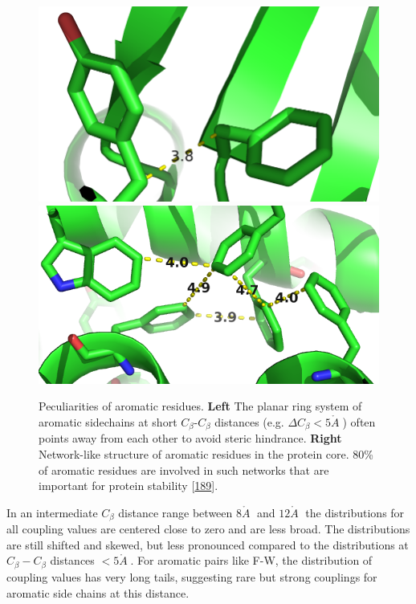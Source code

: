 \documentclass[11pt,a4paper,twoside]{book}
\newcommand{\Cb}{C_\beta}
\newcommand{\angstrom}{\mathring{A} \;}
\theoremstyle{definition}
\theoremstyle{definition}
\theoremstyle{remark}
\begin{document}
\begin{figure}
\includegraphics[width=0.5\linewidth]{img/coupling_matrix_analysis/aromatic_residues_short_distance} \includegraphics[width=0.5\linewidth]{img/coupling_matrix_analysis/aromatic_bundle} \caption{Peculiarities of aromatic
residues. \textbf{Left} The planar ring system of aromatic sidechains at
short \(\Cb\)-\(\Cb\) distances (e.g. \(\Delta \Cb < 5 \angstrom\))
often points away from each other to avoid steric hindrance.
\textbf{Right} Network-like structure of aromatic residues in the
protein core. 80\% of aromatic residues are involved in such networks
that are important for protein stability
{[}\protect\hyperlink{ref-Burley1985}{189}{]}.}\label{fig:aromatic-residue-properties}
\end{figure}

In an intermediate \(\Cb\) distance range between \(8\angstrom\) and
\(12\angstrom\) the distributions for all coupling values are centered
close to zero and are less broad. The distributions are still shifted
and skewed, but less pronounced compared to the distributions at
\(\Cb-\Cb\) distances \(< 5\angstrom\). For aromatic pairs like F-W, the
distribution of coupling values has very long tails, suggesting rare but
strong couplings for aromatic side chains at this distance.
\end{document}
